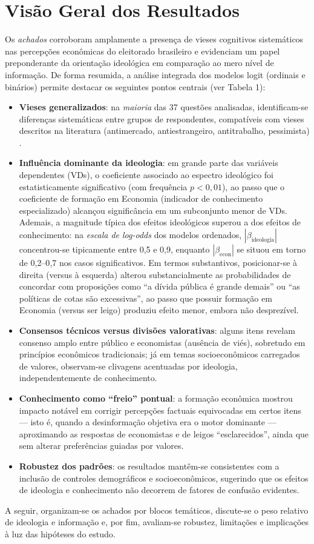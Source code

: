 \chapter{Visão Geral dos Resultados}
Os \textit{achados} corroboram amplamente a presença de vieses cognitivos sistemáticos nas percepções econômicas do eleitorado brasileiro e evidenciam um papel preponderante da orientação ideológica em comparação ao mero nível de informação. De forma resumida, a análise integrada dos modelos logit (ordinais e binários) permite destacar os seguintes pontos centrais (ver Tabela 1):
\begin{itemize}
    \item \textbf{Vieses generalizados}: na \textit{maioria} das 37 questões analisadas, identificam-se diferenças sistemáticas entre grupos de respondentes, compatíveis com vieses descritos na literatura (antimercado, antiestrangeiro, antitrabalho, pessimista) \cite{The_Myth_of_the_Rational_Voter}.
    \item \textbf{Influência dominante da ideologia}: em grande parte das variáveis dependentes (VDs), o coeficiente associado ao espectro ideológico foi estatisticamente significativo (com frequência \(p<0{,}01\)), ao passo que o coeficiente de formação em Economia (indicador de conhecimento especializado) alcançou significância em um subconjunto menor de VDs. Ademais, a magnitude típica dos efeitos ideológicos superou a dos efeitos de conhecimento: na \textit{escala de log-odds} dos modelos ordenados, \(|\beta_{\text{ideologia}}|\) concentrou-se tipicamente entre 0{,}5 e 0{,}9, enquanto \(|\beta_{\text{econ}}|\) se situou em torno de 0{,}2–0{,}7 nos casos significativos. Em termos substantivos, posicionar-se à direita (versus à esquerda) alterou substancialmente as probabilidades de concordar com proposições como “a dívida pública é grande demais” ou “as políticas de cotas são excessivas”, ao passo que possuir formação em Economia (versus ser leigo) produziu efeito menor, embora não desprezível.
    \item \textbf{Consensos técnicos versus divisões valorativas}: alguns itens revelam consenso amplo entre público e economistas (ausência de viés), sobretudo em princípios econômicos tradicionais; já em temas socioeconômicos carregados de valores, observam-se clivagens acentuadas por ideologia, independentemente de conhecimento.
    \item \textbf{Conhecimento como “freio” pontual}: a formação econômica mostrou impacto notável em corrigir percepções factuais equivocadas em certos itens — isto é, quando a desinformação objetiva era o motor dominante — aproximando as respostas de economistas e de leigos “esclarecidos”, ainda que sem alterar preferências guiadas por valores.
    \item \textbf{Robustez dos padrões}: os resultados mantêm-se consistentes com a inclusão de controles demográficos e socioeconômicos, sugerindo que os efeitos de ideologia e conhecimento não decorrem de fatores de confusão evidentes.
\end{itemize}
A seguir, organizam-se os achados por blocos temáticos, discute-se o peso relativo de ideologia e informação e, por fim, avaliam-se robustez, limitações e implicações à luz das hipóteses do estudo.


